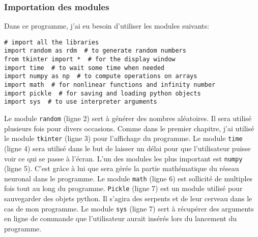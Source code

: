 \documentclass[12pt, a4paper, openany]{book}
\begin{document}
\subsubsection{Importation des modules}
\label{r:2.7.1-imp}
Dans ce programme, j'ai eu besoin d'utiliser les modules suivants:
\begin{verbatim}
# import all the libraries
import random as rdm  # to generate random numbers
from tkinter import *  # for the display window
import time  # to wait some time when needed
import numpy as np  # to compute operations on arrays
import math  # for nonlinear functions and infinity number
import pickle  # for saving and loading python objects
import sys  # to use interpreter arguments
\end{verbatim}
Le module \verb'random' (ligne 2) sert à générer des nombres aléatoires. Il sera utilisé plusieurs fois pour divers occasions. Comme dans le premier chapitre, j'ai utilisé le module \verb'tkinter' (ligne 3) pour l'affichage du programme. Le module \verb'time' (ligne 4) sera utilisé dans le but de laisser un délai pour que l'utilisateur puisse voir ce qui se passe à l'écran. L'un des modules les plus important est \verb'numpy' (ligne 5). C'est grâce à lui que sera gérée la partie mathématique du réseau neuronal dans le programme. Le module \verb'math' (ligne 6) est sollicité de multiples fois tout au long du programme. \verb'Pickle' (ligne 7) est un module utilisé pour sauvegarder des objets python. Il s’agira des serpents et de leur cerveau dans le cas de mon programme. Le module \verb'sys' (ligne 7) sert à récupérer des arguments en ligne de commande que l'utilisateur aurait insérés lors du lancement du programme.
\end{document}
